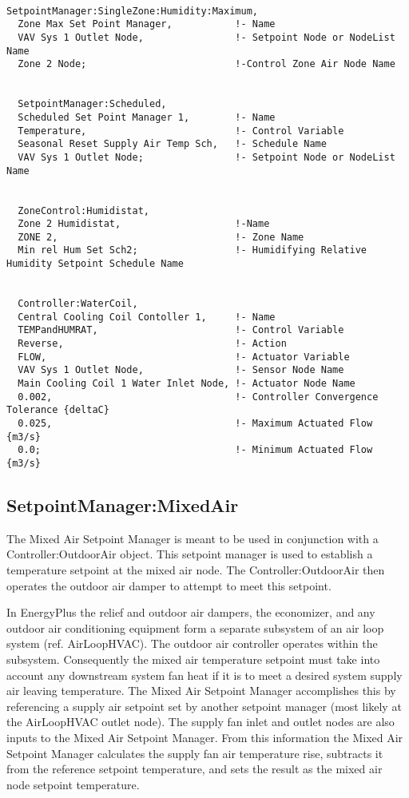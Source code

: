 \begin{lstlisting}

SetpointManager:SingleZone:Humidity:Maximum,
  Zone Max Set Point Manager,           !- Name
  VAV Sys 1 Outlet Node,                !- Setpoint Node or NodeList Name
  Zone 2 Node;                          !-Control Zone Air Node Name


  SetpointManager:Scheduled,
  Scheduled Set Point Manager 1,        !- Name
  Temperature,                          !- Control Variable
  Seasonal Reset Supply Air Temp Sch,   !- Schedule Name
  VAV Sys 1 Outlet Node;                !- Setpoint Node or NodeList Name


  ZoneControl:Humidistat,
  Zone 2 Humidistat,                    !-Name
  ZONE 2,                               !- Zone Name
  Min rel Hum Set Sch2;                 !- Humidifying Relative Humidity Setpoint Schedule Name


  Controller:WaterCoil,
  Central Cooling Coil Contoller 1,     !- Name
  TEMPandHUMRAT,                        !- Control Variable
  Reverse,                              !- Action
  FLOW,                                 !- Actuator Variable
  VAV Sys 1 Outlet Node,                !- Sensor Node Name
  Main Cooling Coil 1 Water Inlet Node, !- Actuator Node Name
  0.002,                                !- Controller Convergence Tolerance {deltaC}
  0.025,                                !- Maximum Actuated Flow {m3/s}
  0.0;                                  !- Minimum Actuated Flow {m3/s}
\end{lstlisting}

\subsection{SetpointManager:MixedAir}\label{setpointmanagermixedair}

The Mixed Air Setpoint Manager is meant to be used in conjunction with a Controller:OutdoorAir object. This setpoint manager is used to establish a temperature setpoint at the mixed air node. The Controller:OutdoorAir then operates the outdoor air damper to attempt to meet this setpoint.

In EnergyPlus the relief and outdoor air dampers, the economizer, and any outdoor air conditioning equipment form a separate subsystem of an air loop system (ref. AirLoopHVAC). The outdoor air controller operates within the subsystem. Consequently the mixed air temperature setpoint must take into account any downstream system fan heat if it is to meet a desired system supply air leaving temperature. The Mixed Air Setpoint Manager accomplishes this by referencing a supply air setpoint set by another setpoint manager (most likely at the AirLoopHVAC outlet node). The supply fan inlet and outlet nodes are also inputs to the Mixed Air Setpoint Manager. From this information the Mixed Air Setpoint Manager calculates the supply fan air temperature rise, subtracts it from the reference setpoint temperature, and sets the result as the mixed air node setpoint temperature.

